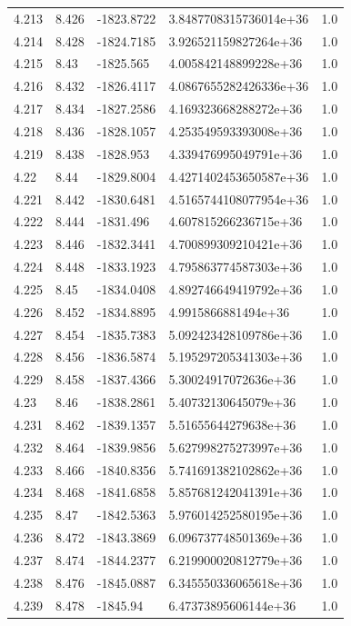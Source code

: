 \begin{tabular}{lllll}
4.213 & 8.426 & -1823.8722 & 3.8487708315736014e+36 & 1.0 \\
4.214 & 8.428 & -1824.7185 & 3.926521159827264e+36 & 1.0 \\
4.215 & 8.43 & -1825.565 & 4.005842148899228e+36 & 1.0 \\
4.216 & 8.432 & -1826.4117 & 4.0867655282426336e+36 & 1.0 \\
4.217 & 8.434 & -1827.2586 & 4.169323668288272e+36 & 1.0 \\
4.218 & 8.436 & -1828.1057 & 4.253549593393008e+36 & 1.0 \\
4.219 & 8.438 & -1828.953 & 4.339476995049791e+36 & 1.0 \\
4.22 & 8.44 & -1829.8004 & 4.4271402453650587e+36 & 1.0 \\
4.221 & 8.442 & -1830.6481 & 4.5165744108077954e+36 & 1.0 \\
4.222 & 8.444 & -1831.496 & 4.607815266236715e+36 & 1.0 \\
4.223 & 8.446 & -1832.3441 & 4.700899309210421e+36 & 1.0 \\
4.224 & 8.448 & -1833.1923 & 4.795863774587303e+36 & 1.0 \\
4.225 & 8.45 & -1834.0408 & 4.892746649419792e+36 & 1.0 \\
4.226 & 8.452 & -1834.8895 & 4.9915866881494e+36 & 1.0 \\
4.227 & 8.454 & -1835.7383 & 5.092423428109786e+36 & 1.0 \\
4.228 & 8.456 & -1836.5874 & 5.195297205341303e+36 & 1.0 \\
4.229 & 8.458 & -1837.4366 & 5.30024917072636e+36 & 1.0 \\
4.23 & 8.46 & -1838.2861 & 5.40732130645079e+36 & 1.0 \\
4.231 & 8.462 & -1839.1357 & 5.51655644279638e+36 & 1.0 \\
4.232 & 8.464 & -1839.9856 & 5.627998275273997e+36 & 1.0 \\
4.233 & 8.466 & -1840.8356 & 5.741691382102862e+36 & 1.0 \\
4.234 & 8.468 & -1841.6858 & 5.857681242041391e+36 & 1.0 \\
4.235 & 8.47 & -1842.5363 & 5.976014252580195e+36 & 1.0 \\
4.236 & 8.472 & -1843.3869 & 6.096737748501369e+36 & 1.0 \\
4.237 & 8.474 & -1844.2377 & 6.219900020812779e+36 & 1.0 \\
4.238 & 8.476 & -1845.0887 & 6.345550336065618e+36 & 1.0 \\
4.239 & 8.478 & -1845.94 & 6.47373895606144e+36 & 1.0 \\

\end{tabular}
